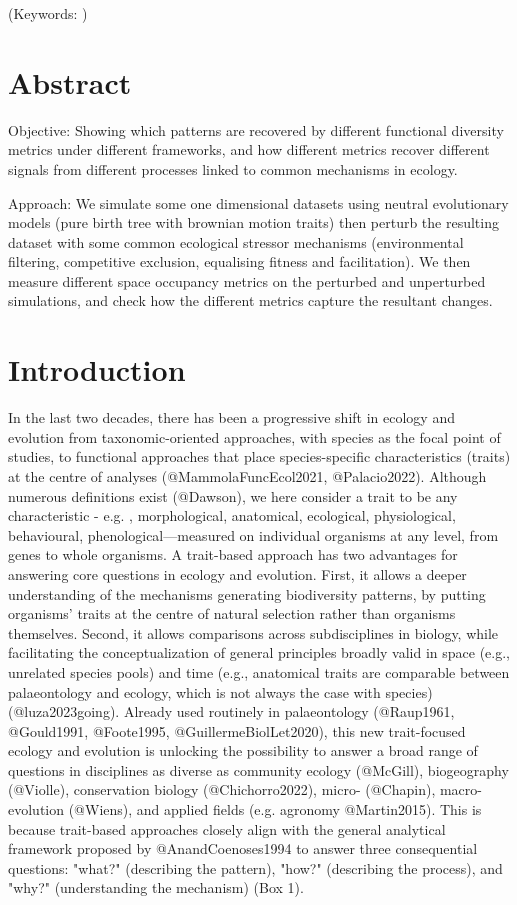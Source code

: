\documentclass[12pt,letterpaper]{article}
\begin{document}
\noindent (Keywords: )\\

\section{Abstract}
Objective: Showing which patterns are recovered by different functional diversity metrics under different frameworks, and how different metrics recover different signals from different processes linked to common mechanisms in ecology.

Approach: We simulate some one dimensional datasets using neutral evolutionary models (pure birth tree with brownian motion traits) then perturb the resulting dataset with some common ecological stressor mechanisms (environmental filtering, competitive exclusion, equalising fitness and facilitation).
We then measure different space occupancy metrics on the perturbed and unperturbed simulations, and check how the different metrics capture the resultant changes.


\section{Introduction}

In the last two decades, there has been a progressive shift in ecology and evolution from  taxonomic-oriented approaches, with species as the focal point of studies, to functional approaches that place species-specific characteristics (traits) at the centre of analyses (@MammolaFuncEcol2021, @Palacio2022).
Although numerous definitions exist (@Dawson), we here consider a trait to be any characteristic - e.g. , morphological, anatomical, ecological, physiological, behavioural, phenological—measured on individual organisms at any level, from genes to whole organisms.
A trait-based approach has two advantages for answering core questions in ecology and evolution.
First, it allows a deeper understanding of the mechanisms generating biodiversity patterns, by putting organisms’ traits at the centre of natural selection rather than organisms themselves.
Second, it allows comparisons across subdisciplines in biology, while facilitating the conceptualization of general principles broadly valid in space (e.g., unrelated species pools) and time (e.g., anatomical traits are comparable between palaeontology and ecology, which is not always the case with species) (@luza2023going).
Already used routinely in palaeontology (@Raup1961, @Gould1991, @Foote1995, @GuillermeBiolLet2020), this new trait-focused ecology and evolution is unlocking the possibility to answer a broad range of questions in disciplines as diverse as community ecology (@McGill), biogeography (@Violle), conservation biology (@Chichorro2022), micro- (@Chapin), macro-evolution (@Wiens), and applied fields (e.g. agronomy @Martin2015).
This is because trait-based approaches closely align with the general analytical framework proposed by @AnandCoenoses1994 to answer three consequential questions: "what?" (describing the pattern), "how?" (describing the process), and "why?" (understanding the mechanism) (Box 1).
\end{document}
